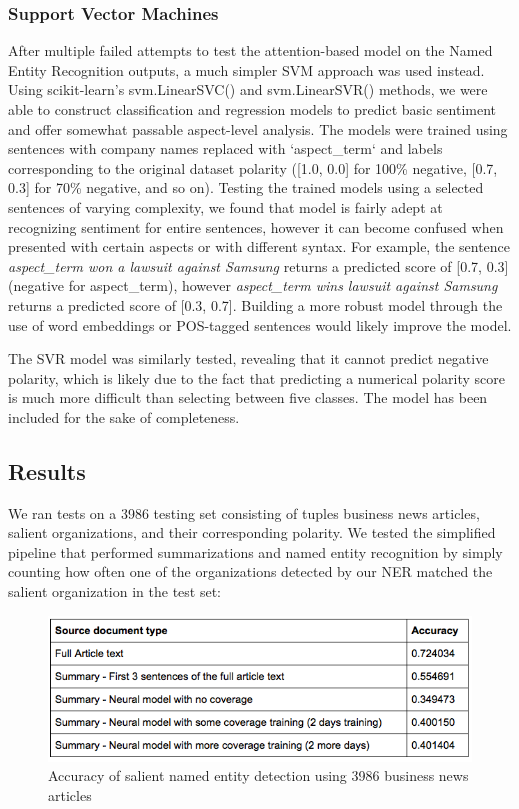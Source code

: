 \documentclass[12pt,a4paper]{article}
\begin{document}
\subsubsection{Support Vector Machines}
After multiple failed attempts to test the attention-based model on the Named Entity Recognition outputs, a much simpler SVM approach was used instead. Using scikit-learn's svm.LinearSVC() and svm.LinearSVR() methods, we were able to construct classification and regression models to predict basic sentiment and offer somewhat passable aspect-level analysis. The models were trained using sentences with company names replaced with `aspect\_term` and labels corresponding to the original dataset polarity ([1.0, 0.0] for 100\% negative, [0.7, 0.3] for 70\% negative, and so on). Testing the trained models using a selected sentences of varying complexity, we found that model is fairly adept at recognizing sentiment for entire sentences, however it can become confused when presented with certain aspects or with different syntax. For example, the sentence \textit{aspect\_term won a lawsuit against Samsung} returns a predicted score of [0.7, 0.3] (negative for aspect\_term), however \textit{aspect\_term wins lawsuit against Samsung} returns a predicted score of [0.3, 0.7]. Building a more robust model through the use of word embeddings or POS-tagged sentences would likely improve the model. 

The SVR model was similarly tested, revealing that it cannot predict negative polarity, which is likely due to the fact that predicting a numerical polarity score is much more difficult than selecting between five classes. The model has been included for the sake of completeness.

\subsection{Results}
We ran tests on a 3986 testing set consisting of tuples  business news articles, salient organizations, and their corresponding polarity. We tested the simplified pipeline that performed summarizations and named entity recognition by simply counting how often one of the organizations detected by our NER matched the salient organization in the test set:

\begin{figure}[H]
  \centering
  \includegraphics[scale=0.6]{results_01.png}
  \caption{Accuracy of salient named entity detection using 3986 business news articles}
  \label{fig:network_performance}
\end{figure}
\end{document}
